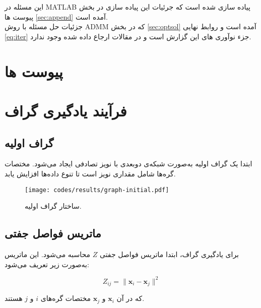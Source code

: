 \documentclass[10pt,twocolumn,a4paper]{article}
\begin{document}
  این مسئله در MATLAB پیاده سازی شده است که جرئیات این پیاده سازی در  بخش پیوست ها
  \ref{sec:append}
  آمده است. \\
  
  جزئیات حل مسئله با روش ADMM که در بخش
   \ref{sec:optsol}
   آمده است و روابط نهایی 
   \ref{eq:iter}
   جزء نوآوری های این گزارش است و در مقالات ارجاع داده شده وجود ندارد.
  
  

\nocite{*}



\clearpage

\section*{پیوست ها}\label{sec:append}
	\appendix
	
	\section{فرآیند یادگیری گراف}
	
	\subsection{گراف اولیه}
	ابتدا یک گراف اولیه به‌صورت شبکه‌ی دوبعدی با نویز تصادفی ایجاد می‌شود. مختصات گره‌ها شامل مقداری نویز است تا تنوع داده‌ها افزایش یابد.
	
	\begin{latin}
		
	\end{latin}
	
	\begin{figure}[H]
		\centering
		\texttt{[image: codes/results/graph-initial.pdf]}
		\caption{ساختار گراف اولیه.}
		\label{fig:graph-initial}
	\end{figure}
	
	\subsection{ماتریس فواصل جفتی}
	برای یادگیری گراف، ابتدا ماتریس فواصل جفتی \( Z \) محاسبه می‌شود. این ماتریس به‌صورت زیر تعریف می‌شود:
	
	\[
	Z_{ij} = \|\mathbf{x}_i - \mathbf{x}_j\|^2
	\]
	
	که در آن \( \mathbf{x}_i \) و \( \mathbf{x}_j \) مختصات گره‌های \( i \) و \( j \) هستند.
	
	\begin{latin}
		
	\end{latin}
	
\end{document}
